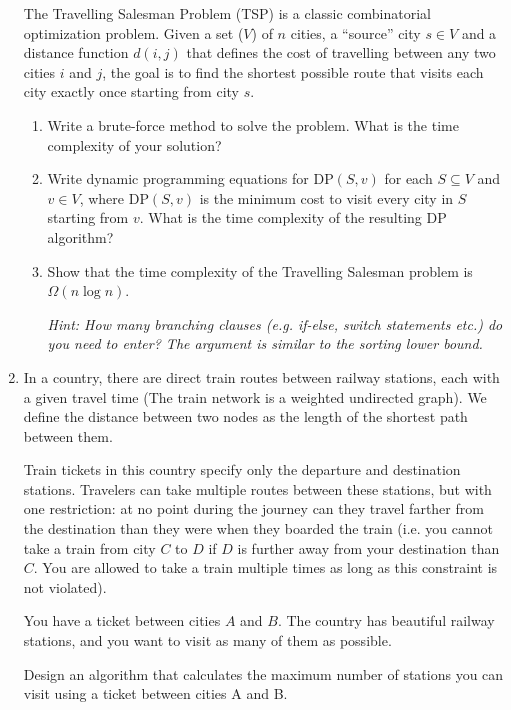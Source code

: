 \documentclass{article}
\begin{document}
\begin{enumerate}
The Travelling Salesman Problem (TSP) is a classic combinatorial optimization problem. Given a set ($V$) of $n$ cities, a ``source'' city $s\in V$ and a distance function $d(i, j)$ that defines the cost of travelling between any two cities $i$ and $j$, the goal is to find the shortest possible route that visits each city exactly once starting from city $s$.
\begin{enumerate}
    \item Write a brute-force method to solve the problem. What is the time complexity of your solution?
    \item Write dynamic programming equations for $\mathrm{DP}(S,v)$ for each $S\subseteq V$ and $v \in V$, where $\mathrm{DP}(S,v)$ is the minimum  cost to visit every city in $S$ starting from $v$. What is the time complexity of the resulting DP algorithm?
    \item Show that the time complexity of the Travelling Salesman problem is $\Omega(n \log n)$. 

    \emph{ Hint: How many branching clauses (e.g. if-else, switch statements etc.) do you need to enter? The argument is similar to the sorting lower bound.}
   
\end{enumerate}


    \item In a country, there are direct train routes between railway stations, each with a given travel time (The train network is a weighted undirected graph). We define the distance between two nodes as the length of the shortest path between them.

Train tickets in this country specify only the departure and destination stations. Travelers can take multiple routes between these stations, but with one restriction: at no point during the journey can they travel farther from the destination than they were when they boarded the train (i.e. you cannot take a train from city $C$ to $D$ if $D$ is further away from your destination than $C$. You are allowed to take a train multiple times as long as this constraint is not violated).

You have a ticket between cities $A$ and $B$. The country has beautiful railway stations, and you want to visit as many of them as possible.

Design an algorithm that calculates the maximum number of stations you can visit using a ticket between cities A and B.

\end{enumerate}
\end{document}
